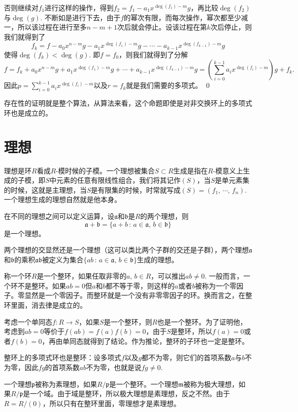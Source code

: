 	否则继续对$f_1$进行这样的操作，得到$f_2=f_1-a_1x^{\deg(f_1)-m}g$，再比较$\deg(f_2)$与$\deg(g)$. 不断如是进行下去，由于$f$的幂次有限，而每次操作，幂次都至少减一，所以该过程在进行至多$n-m+1$次后就会停止。设该过程在第$k$次后停止，则我们就得到了
	\[
	f_{k}=f-a_0x^{n-m}g-a_1x^{\deg(f_1)-m}g-\cdots-a_{k-1}x^{\deg(f_{k-1})-m}g
	\]
	使得$\deg(f_k)< \deg(g)$. 即$f=f_0$，则我们就得到了分解
	\[
	f=f_k+a_0x^{n-m}g+a_1x^{\deg(f_1)-m}g+\cdots+a_{k-1}x^{\deg(f_{k-1})-m}g=\left(\sum_{i=0}^{k-1}a_{i}x^{\deg(f_{i})-m}\right)g+f_k.
	\]
	因此$p=\sum_{i=0}^{k-1}a_{i}x^{\deg(f_{i})-m}$以及$r=f_k$就是我们需要的多项式。
\qed

存在性的证明就是整个算法，从算法来看，这个命题即使是对非交换环上的多项式环也是成立的。

\section{理想}

\para 理想是环$R$看成$R$-模时候的子模。一个理想被集合$S\subset R$生成是指在$R$-模意义上生成的子模，即$S$中元素的任意有限线性组合，我们将其记作$(S)$，当$S$是单元素集的时候，这就是主理想，当$S$是有限集的时候，时常就写成$(S)=(f_1,\,\cdots,\,f_n)$. 一个理想生成的理想自然就是他本身。

\para 在不同的理想之间可以定义运算，设$\mathfrak{a}$和$\mathfrak{b}$是$R$的两个理想，则
\[\mathfrak{a}+\mathfrak{b}=\{a+b\,:\,a\in\mathfrak{a},\,b\in\mathfrak{b}\}
\]
是一个理想。

两个理想的交显然还是一个理想（这可以类比两个子群的交还是子群），两个理想$\mathfrak{a}$和$\mathfrak{b}$的乘积$\mathfrak{a}\mathfrak{b}$被定义为集合$\{ab\,:\,a\in\mathfrak{a},\,b\in\mathfrak{b}\}$生成的理想。

\para 称一个环$R$是一个整环，如果任取非零的$a$, $b\in R$，可以推出$ab\neq 0$. 一般而言，一个环不是整环。如果$ab=0$但$a$和$b$都不等于零，则这样的$a$或者$b$被称为一个零因子。零显然是一个零因子。而整环就是一个没有非零零因子的环。换而言之，在整环里面，消去律是成立的。

考虑一个单同态$f:R\to S$，如果$S$是一个整环，则$R$也是一个整环。为了证明他，考虑到$ab=0$等价于$f(ab)=f(a)f(b)=0$，由于$S$是整环，所以$f(a)=0$或者$f(b)=0$，再由单同态就得到了结论。作为推论，整环的子环也一定是整环。

整环上的多项式环也是整环：设多项式$f$以及$g$都不为零，则它们的首项系数$a$与$b$不为零，因此$fg$的首项系数$ab$不为零，也就是说$fg\neq 0$.

\para 一个理想$\mathfrak{p}$被称为素理想，如果$R/\mathfrak{p}$是一个整环。一个理想$\mathfrak{m}$被称为极大理想，如果$R/\mathfrak{p}$是一个域。由于域是整环，所以极大理想是素理想，反之不然。由于$R=R/(0)$，所以只有在整环里面，零理想才是素理想。

